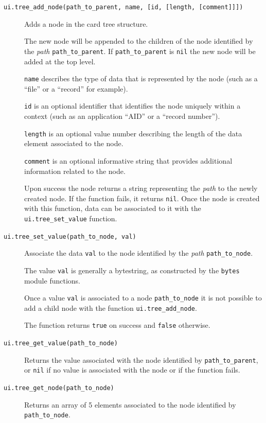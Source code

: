 \documentclass[11pt]{report}
\begin{document}
\begin{description}

\item[\texttt{ui.tree\_add\_node(path\_to\_parent, name, [id, [length, [comment]]])}]
{
  Adds a node in the card tree structure. 

  The new node will be appended to the children of the node identified by the 
  \emph{path} \texttt{path\_to\_parent}.
  If \texttt{path\_to\_parent} is \texttt{nil} the new node will be added at 
  the top level.

  \texttt{name} describes the type of data that is represented by the node 
  (such as a ``file'' or a ``record'' for example). 

  \texttt{id} is an optional identifier that identifies the node uniquely within 
  a context (such as an application ``AID'' or a ``record number'').

  \texttt{length} is an optional value number describing the length of the 
  data element associated to the node.

  \texttt{comment} is an optional informative string that provides additional 
  information related to the node.
  
  Upon success the node returns a string representing the \emph{path} to the 
  newly created node. 
  If the function fails, it returns \texttt{nil}.
  Once the node is created with this function, data can be associated to it with the \texttt{ui.tree\_set\_value} function.
}

\item[\texttt{ui.tree\_set\_value(path\_to\_node, val)}]
{
  Associate the data \texttt{val} to the node identified by the \emph{path} 
  \texttt{path\_to\_node}.

  The value \texttt{val} is generally a bytestring, 
  as constructed by the \texttt{bytes} module functions.

  Once a value \texttt{val} is associated to a node \texttt{path\_to\_node} 
  it is not possible to add a child node with the function \texttt{ui.tree\_add\_node}.
	  
  The function returns \texttt{true} on success and \texttt{false} otherwise.
}

\item[\texttt{ui.tree\_get\_value(path\_to\_node)}]
{
  Returns the value associated with the node identified by \texttt{path\_to\_parent}, 
  or \texttt{nil} if no value is associated with the node or if the function fails.
} 

\item[\texttt{ui.tree\_get\_node(path\_to\_node)}]
{
  Returns an array of 5 elements associated to the node identified by 
  \texttt{path\_to\_node}.
 
}
\end{description}
\end{document}

